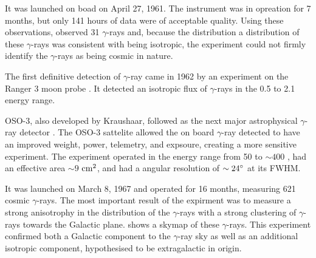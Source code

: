 It was launched on boad \explorerxi on April 27,
1961. The instrument was in opreation for 7 months, but only 141 hours
of data were of acceptable quality.  Using these observations, \explorerxi
observed 31 $\gamma$-rays and, because the distribution a distribution of
these $\gamma$-rays was consistent with being isotropic, the experiment
could not firmly identify the $\gamma$-rays as being cosmic in nature.





The first definitive detection of $\gamma$-ray came in
1962 by an experiment on the Ranger 3 moon
probe \citep{arnold_1962_gamma-space}.  It detected an isotropic flux
of $\gamma$-rays in the 0.5 \mev to 2.1 \mev energy range.

\ac{OSO-3}, also developed by Kraushaar, followed \explorerxi
as the next major astrophysical $\gamma$-ray detector
\cite{kraushaar_1972_high-energy-cosmic}.  The \ac{OSO-3} sattelite
allowed the on board $\gamma$-ray detected to have an improved weight,
power, telemetry, and expsoure, creating a more sensitive experiment.
The experiment operated in the energy range from 50 \mev to $\sim 400$
\mev, had an effective area $\sim 9$ $\text{cm}^2$, and had a angular resolution of
$\sim 24^\circ$ at its \ac{FWHM}.

It was launched on March 8, 1967 and operated for 16 months, measuring
621 cosmic $\gamma$-rays.  The most important result of the expirment was
to measure a strong anisotrophy in the distribution of the $\gamma$-rays
with a strong clustering of $\gamma$-rays towards the Galactic plane.
 shows a skymap of these $\gamma$-rays.  This
experiment confirmed both a Galactic component to the $\gamma$-ray
sky as well as an additional isotropic component, hypothesised to be
extragalactic in origin.

